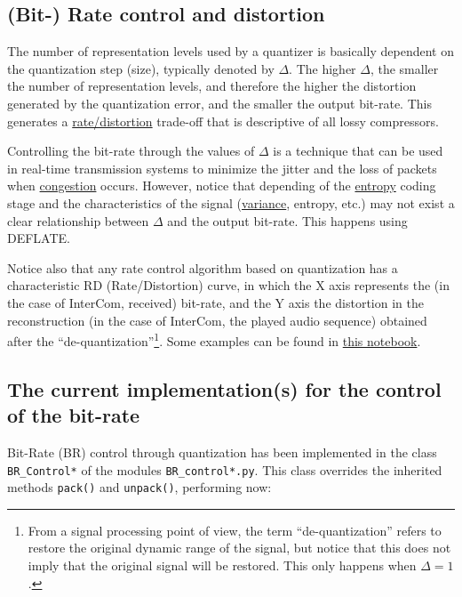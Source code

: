 
\subsection{(Bit-) Rate control and distortion}
The number of representation levels used by a quantizer is basically
dependent on the quantization step (size), typically denoted by
$\Delta$. The higher $\Delta$, the smaller the number of
representation levels, and therefore the higher the distortion
generated by the quantization error, and the smaller the output
bit-rate. This generates a
\href{https://en.wikipedia.org/wiki/Rate%E2%80%93distortion_theory}{rate/distortion}
  trade-off that is descriptive of all lossy compressors.

Controlling the bit-rate through the values of $\Delta$ is a technique
that can be used in real-time transmission systems to minimize the
jitter and the loss of packets when
\href{https://en.wikipedia.org/wiki/Network_congestion}{congestion}
occurs. However, notice that depending of the
\href{https://en.wikipedia.org/wiki/Entropy_(information_theory)}{entropy}
coding stage and the characteristics of the signal
(\href{https://en.wikipedia.org/wiki/Variance}{variance}, entropy, etc.) may
not exist a clear relationship between $\Delta$ and the output
bit-rate. This happens using DEFLATE.

Notice also that any rate control algorithm based on quantization has
a characteristic RD (Rate/Distortion) curve, in which the X axis
represents the (in the case of InterCom, received) bit-rate, and the Y
axis the distortion in the reconstruction (in the case of InterCom,
the played audio sequence) obtained after the
``de-quantization''\footnote{From a signal processing point of view,
  the term ``de-quantization'' refers to restore the original dynamic
  range of the signal, but notice that this does not imply that the
  original signal will be restored. This only happens when
  $\Delta=1$.}. Some examples can be found in
\href{https://github.com/Tecnologias-multimedia/Tecnologias-multimedia.github.io/blob/master/contents/BR_control/audio_quantization.ipynb}{this
  notebook}.

\subsection{The current implementation(s) for the control of the bit-rate}
Bit-Rate (BR) control through quantization has been implemented in the
class \verb|BR_Control*| of the modules \texttt{BR\_control*.py}. This
class overrides the inherited methods \verb|pack()| and
\verb|unpack()|, performing now:

